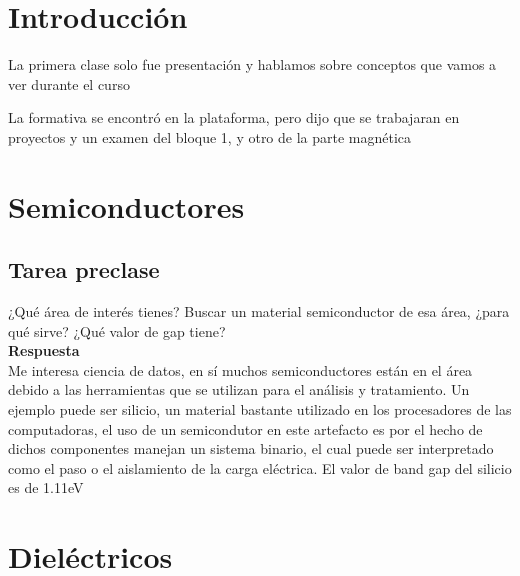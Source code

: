 \documentclass[11pt]{report}
\theoremstyle{plain}
\theoremstyle{definition}
\begin{document}

\tableofcontents


\chapter{Introducción}
La primera clase solo fue presentación y hablamos sobre conceptos que vamos a ver durante el curso

La formativa se encontró en la plataforma, pero dijo que se trabajaran en proyectos y un examen del bloque 1, y otro de la parte magnética
\chapter{Semiconductores}

\section{Tarea preclase}
¿Qué área de interés tienes? Buscar un material semiconductor de esa área, ¿para qué sirve? ¿Qué valor de gap tiene?\\

\textbf{Respuesta}\\

Me interesa ciencia de datos, en sí muchos semiconductores están en el área debido a las herramientas que se utilizan para el análisis y tratamiento. Un ejemplo puede ser silicio, un material bastante utilizado en los procesadores de las computadoras, el uso de un semicondutor en este artefacto es por el hecho de dichos componentes manejan un sistema binario, el cual puede ser interpretado como el paso o el aislamiento de la carga eléctrica. El valor de band gap del silicio es de 1.11eV

\chapter{Dieléctricos}

\end{document}
